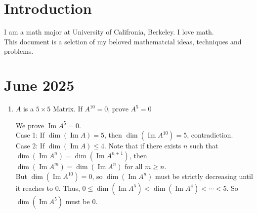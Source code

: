 \documentclass{article}
\DeclareMathOperator{\Ima}{Im}
\newenvironment{solution}{
  \begin{tcolorbox}[mysolutionbox]
}{
  \end{tcolorbox}
}
\begin{document}
\section*{Introduction}
I am a math major at University of Califronia, Berkeley. I love math. 
\\
This document is a selction of my beloved mathematcial ideas, techniques and problems. 
\section{June 2025}
\begin{enumerate}
    \item $A$ is a $5 \times 5 $ Matrix. If $A^{10}=0$, prove $A^5=0$
    \begin{solution}
        We prove $\Ima A^5=0$.
        \\
        
        Case 1: If $\dim (\Ima A)=5$, then $\dim (\Ima A^{10})=5$, contradiction. 
        \\
        
        Case 2: If $\dim (\Ima A)\leq 4$. Note that if there exists $n$ such that $\dim (\Ima A^n)=\dim (\Ima A^{n+1})$, then $\dim (\Ima A^m)=\dim (\Ima A^{n})$ for all $m\geq n$. 
        \\
        But $\dim (\Ima A^{10})=0$, so $\dim (\Ima A^{n})$ must be strictly decreasing until it reaches to $0$. Thus, $0\le\dim (\Ima A^{5})<\dim (\Ima A^{4})<\cdots <5$. So $\dim (\Ima A^{5})$ must be $0$. 
    \end{solution}
    

\end{enumerate}
\end{document}
